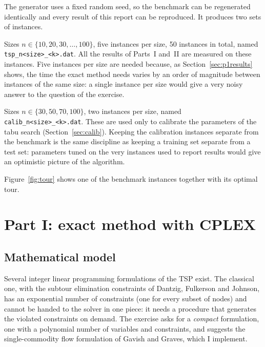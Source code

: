 \documentclass[11pt,a4paper]{article}
\begin{document}
The generator uses a fixed random seed, so the benchmark can be regenerated identically and
every result of this report can be reproduced. It produces two sets of instances.
\begin{description}[style=nextline]
  \item[Benchmark set (seed 2026).] Sizes $n\in\{10,20,30,\dots,100\}$, five instances per
    size, 50 instances in total, named \texttt{tsp\_n<size>\_<k>.dat}. All the results of
    Parts~I and~II are measured on these instances. Five instances per size are needed
    because, as Section~\ref{sec:p1results} shows, the time the exact method needs varies by
    an order of magnitude between instances of the same size: a single instance per size would
    give a very noisy answer to the question of the exercise.
  \item[Calibration set (seed 7).] Sizes $n\in\{30,50,70,100\}$, two instances per size,
    named \texttt{calib\_n<size>\_<k>.dat}. These are used only to calibrate the parameters of
    the tabu search (Section~\ref{sec:calib}). Keeping the calibration instances separate from
    the benchmark is the same discipline as keeping a training set separate from a test set:
    parameters tuned on the very instances used to report results would give an
    optimistic picture of the algorithm.
\end{description}
Figure~\ref{fig:tour} shows one of the benchmark instances together with its optimal tour.

\section{Part I: exact method with CPLEX}\label{sec:assignment1}
\subsection{Mathematical model}\label{sec:model}
Several integer linear programming formulations of the TSP exist. The classical one, with
the subtour elimination constraints of Dantzig, Fulkerson and Johnson, has an exponential
number of constraints (one for every subset of nodes) and cannot be handed to the solver in
one piece: it needs a procedure that generates the violated constraints on demand. The
exercise asks for a \emph{compact} formulation, one with a polynomial number of variables and
constraints, and suggests the single-commodity flow formulation of Gavish and Graves, which
I implement.
\end{document}
